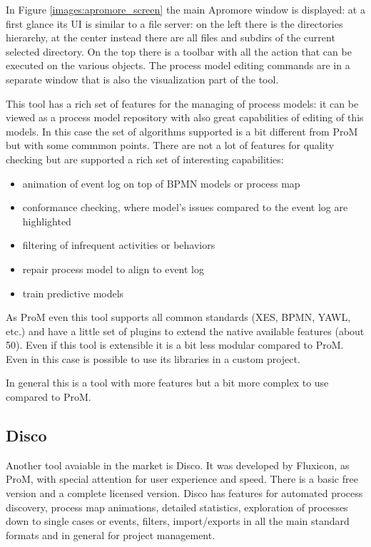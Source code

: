 In Figure \ref{images:apromore_screen} the main Apromore window is displayed: at a first glance its UI is similar to a file 
server: on the left there is the directories hierarchy, at the center instead there are all files and subdirs of the current 
selected directory. On the top there is a toolbar with all the action that can be executed on the various objects. The 
process model editing commands are in a separate window that is also the visualization part of the tool.

This tool has a rich set of features for the managing of process models: it can be viewed as a process model repository with 
also great capabilities of editing of this models. In this case the set of algorithms supported is a bit different from ProM 
but with some commmon points. There are not a lot of features for quality checking but are supported a rich set of 
interesting capabilities:

\begin{itemize}
    \item animation of event log on top of BPMN models or process map
    \item conformance checking, where model's issues compared to the event log are highlighted
    \item filtering of infrequent activities or behaviors
    \item repair process model to align to event log
    \item train predictive models
\end{itemize}

As ProM even this tool supports all common standards (XES, BPMN, YAWL, etc.) and have a little set of plugins to extend 
the native available features (about 50). Even if this tool is extensible it is a bit less modular compared to ProM. Even in 
this case is possible to use its libraries in a custom project.

In general this is a tool with more features but a bit more complex to use compared to ProM.


\subsection{Disco}
Another tool avaiable in the market is Disco. It was developed by Fluxicon, as ProM, with special attention for user experience 
and speed. There is a basic free version and a complete licensed version. Disco has features for automated process discovery, 
process map animations, detailed statistics, exploration of processes down to single cases or events, filters, import/exports 
in all the main standard formats and in general for project management.

